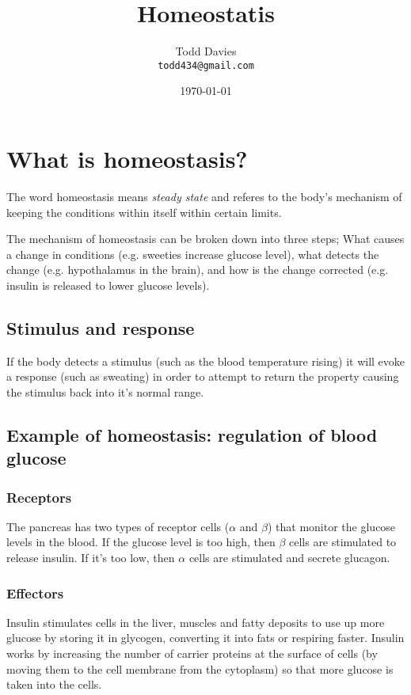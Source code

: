 \documentclass{article}
\title{Homeostatis}
\author{Todd Davies\\
	\texttt{\small todd434@gmail.com}}
\date{\today}
\begin{document}
\lhead{\today}

\maketitle

\section*{What is homeostasis?}
\thispagestyle{empty}

The word homeostasis means {\it steady state} and referes to the body's
mechanism of keeping the conditions within itself within certain limits.

The mechanism of homeostasis can be broken down into three steps; What causes a
change in conditions (e.g. sweeties increase glucose level), what detects the
change (e.g. hypothalamus in the brain), and how is the change corrected (e.g.
insulin is released to lower glucose levels).

\subsection*{Stimulus and response}

If the body detects a stimulus (such as the blood temperature rising) it will
evoke a response (such as sweating) in order to attempt to return the property
causing the stimulus back into it's normal range.

\subsection*{Example of homeostasis: regulation of blood glucose}

\subsubsection*{Receptors}

The pancreas has two types of receptor cells ($\alpha$ and $\beta$) that monitor
the glucose levels in the blood. If the glucose level is too high, then $\beta$
cells are stimulated to release insulin. If it's too low, then $\alpha$ cells
are stimulated and secrete glucagon.

\subsubsection*{Effectors}

Insulin stimulates cells in the liver, muscles and fatty deposits to use up more
glucose by storing it in glycogen, converting it into fats or respiring faster.
Insulin works by increasing the number of carrier proteins at the surface of
cells (by moving them to the cell membrane from the cytoplasm) so that more
glucose is taken into the cells.
\end{document}
